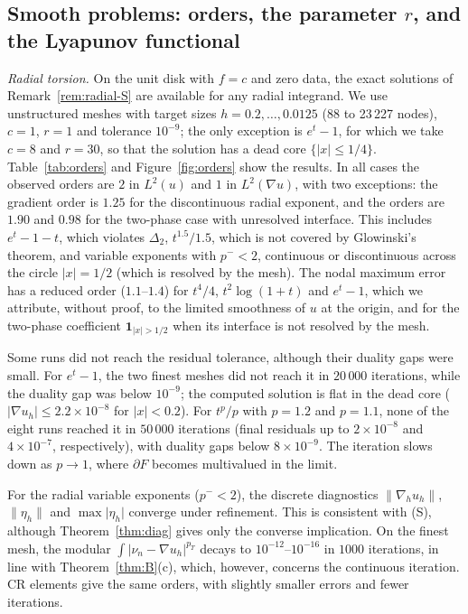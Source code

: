 \documentclass[11pt]{amsart}
\theoremstyle{definition}
\theoremstyle{remark}
\numberwithin{equation}{section}
\newcommand{\abs}[1]{\lvert #1\rvert}
\newcommand{\norm}[1]{\lVert #1\rVert}
\begin{document}
\subsection{Smooth problems: orders, the parameter \texorpdfstring{$r$}{r}, and the Lyapunov functional}\label{ssec:smooth}
\emph{Radial torsion.} On the unit disk with $f=c$ and zero data, the exact solutions of Remark~\ref{rem:radial-S} are available for any radial integrand. We use unstructured meshes with target sizes $h=0.2,\dots,0.0125$ (88 to 23\,227 nodes), $c=1$, $r=1$ and tolerance $10^{-9}$; the only exception is $e^t-1$, for which we take $c=8$ and $r=30$, so that the solution has a dead core $\{\abs x\le1/4\}$. Table~\ref{tab:orders} and Figure~\ref{fig:orders} show the results. In all cases the observed orders are $2$ in $L^2(u)$ and $1$ in $L^2(\nabla u)$, with two exceptions: the gradient order is $1.25$ for the discontinuous radial exponent, and the orders are $1.90$ and $0.98$ for the two-phase case with unresolved interface. This includes $e^t-1-t$, which violates $\Delta_2$, $t^{1.5}/1.5$, which is not covered by Glowinski's theorem, and variable exponents with $p^-<2$, continuous or discontinuous across the circle $\abs x=1/2$ (which is resolved by the mesh). The nodal maximum error has a reduced order ($1.1$--$1.4$) for $t^4/4$, $t^2\log(1+t)$ and $e^t-1$, which we attribute, without proof, to the limited smoothness of $u$ at the origin, and for the two-phase coefficient $\mathbf 1_{\abs x>1/2}$ when its interface is not resolved by the mesh.

Some runs did not reach the residual tolerance, although their duality gaps were small. For $e^t-1$, the two finest meshes did not reach it in $20\,000$ iterations, while the duality gap was below $10^{-9}$; the computed solution is flat in the dead core ($\abs{\nabla u_h}\le2.2\times10^{-8}$ for $\abs x<0.2$). For $t^p/p$ with $p=1.2$ and $p=1.1$, none of the eight runs reached it in $50\,000$ iterations (final residuals up to $2\times10^{-8}$ and $4\times10^{-7}$, respectively), with duality gaps below $8\times10^{-9}$. The iteration slows down as $p\to1$, where $\partial F$ becomes multivalued in the limit.

For the radial variable exponents ($p^-<2$), the discrete diagnostics $\norm{\nabla_hu_h}$, $\norm{\eta_h}$ and $\max\abs{\eta_h}$ converge under refinement. This is consistent with (S), although Theorem~\ref{thm:diag} gives only the converse implication. On the finest mesh, the modular $\int\abs{\nu_n-\nabla u_h}^{p_T}$ decays to $10^{-12}$--$10^{-16}$ in $1000$ iterations, in line with Theorem~\ref{thm:B}(c), which, however, concerns the continuous iteration. CR elements give the same orders, with slightly smaller errors and fewer iterations.
\end{document}
